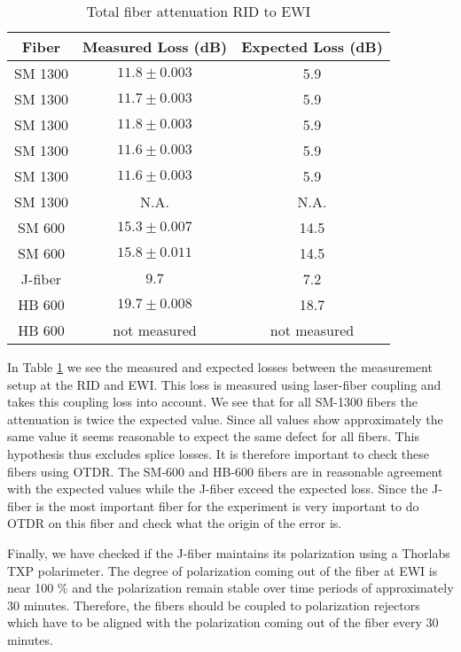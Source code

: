 \begin{table}[hbt]
\caption{Total fiber attenuation RID to EWI}
\label{tab:RIDEWI}
\centering
\begin{tabular}{|c|c|c|}
\hline
Fiber & Measured Loss (dB) & Expected Loss (dB) \\ \hline
SM 1300 & $11.8 \pm 0.003$  & 5.9 \\ \hline
SM 1300 & $11.7 \pm 0.003$  & 5.9 \\ \hline
SM 1300 & $11.8 \pm 0.003$  & 5.9 \\ \hline
SM 1300 & $11.6 \pm 0.003$  & 5.9 \\ \hline
SM 1300 & $11.6 \pm 0.003$  & 5.9 \\ \hline
SM 1300 & N.A. & N.A. \\ \hline
SM 600 & $15.3 \pm 0.007$  & 14.5 \\ \hline
SM 600 & $15.8 \pm 0.011$  & 14.5 \\ \hline
J-fiber & $9.7 $  & 7.2 \\ \hline
HB 600 & $19.7 \pm 0.008$  & 18.7 \\ \hline
HB 600 & not measured  & not measured \\ \hline
\end{tabular}
\end{table}

In Table \ref{tab:RIDEWI} we see the measured and expected losses between the measurement setup at the RID and EWI. This loss is measured using laser-fiber coupling and takes this coupling loss into account. We see that for all SM-1300 fibers the attenuation is twice the expected value. Since all values show approximately the same value it seems reasonable to expect the same defect for all fibers. This hypothesis thus excludes splice losses. It is therefore important to check these fibers using OTDR. The SM-600 and HB-600 fibers are in reasonable agreement with the expected values while the J-fiber exceed the expected loss. Since the J-fiber is the most important fiber for the experiment is very important to do OTDR on this fiber and check what the origin of the error is.


Finally, we have checked if the J-fiber maintains its polarization using a Thorlabs TXP polarimeter. The degree of polarization coming out of the fiber at EWI is near 100 \% and the polarization remain stable over time periods of approximately 30 minutes. Therefore, the fibers should be coupled to polarization rejectors which have to be aligned with the polarization coming out of the fiber every 30 minutes.

